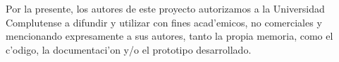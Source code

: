 Por la presente, los autores de este proyecto autorizamos a la Universidad Complutense a difundir y utilizar con fines acad'emicos, no comerciales y
mencionando expresamente a sus autores, tanto la propia memoria, como el c'odigo, la documentaci'on y/o el prototipo desarrollado.
